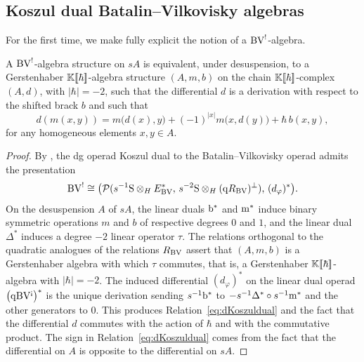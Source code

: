 \subsection{Koszul dual Batalin--Vilkovisky algebras}

For the first time, we make fully explicit the notion of a \(\mathrm{BV}^!\)-algebra.

\begin{proposition}\label{prop:DualBValg}
	A \(\mathrm{BV}^!\)-algebra structure on \(sA\) is equivalent, under desuspension, to a Gerstenhaber \(\mathbb{K}[\![\hbar]\!]\)-algebra structure 
	\((A, m , b %
         )\) on the chain \(\mathbb{K}[\![\hbar]\!]\)-complex \((A,d)\), with \(|\hbar|=-2\), such that the differential \(d\) is a derivation with respect to the shifted brack \(b\) %
         and such that
	\begin{equation}\label{eq:dKoszuldual}
		d(m(x,y)) = m\bigl(d(x),y\bigr) + (-1)^{|x|} m\bigl(x,d(y)\bigr) + \hbar\,b(x,y), %
	\end{equation}
for any homogeneous elements \(x, y \in A\).	
\end{proposition}

\begin{proof}
	By \cite[Proposition~7.2.1]{LodayVallette12}, the dg operad Koszul dual to the Batalin--Vilkovisky operad admits the presentation
	\[
	\mathrm{BV}^! \cong \bigl(\mathcal{P}(s^{-1}\mathrm{S}\otimes_H E_{\mathrm{BV}}^*,\, s^{-2}\mathrm{S}\otimes_H(\mathrm{q} R_{\mathrm{BV}})^{\perp}),\, (d_\varphi)^*\bigr).
	\]
	On the desuspension \(A\) of \(sA\), the linear duals \(\mathrm{b}^*\) and \(\mathrm{m}^*\) induce binary symmetric operations \(m\) and \(b\) 
	of respective degrees \(0\) and \(1\), and the linear dual \(\Delta^*\) induces a degree \(-2\) linear operator \(\tau\).
	The relations orthogonal to the quadratic analogues of the relations \(R_{\mathrm{BV}}\) assert that \((A, m, b)\) %
	is a Gerstenhaber algebra with which \(\tau\) commutes, that is, a Gerstenhaber \(\mathbb{K}[\![\hbar]\!]\)-algebra with \(|\hbar|=-2\).
	The induced differential \((d_\varphi)^*\) on the linear dual operad \(\bigl(\mathrm{q}\mathrm{BV}^{{\scriptstyle \text{\rm !`}}}\bigr)^*\) is the unique derivation sending \(s^{-1}\mathrm{b}^*\) to \(-s^{-1}\Delta^* \circ s^{-1}\mathrm{m}^*\) and the other generators to \(0\).
	This produces Relation~\eqref{eq:dKoszuldual} and the fact that the differential \(d\) commutes with the action of \(\hbar\) and with the commutative product.
	The sign in Relation~\eqref{eq:dKoszuldual} comes from the fact that the differential on \(A\) is opposite to the differential on \(sA\).
\end{proof}

